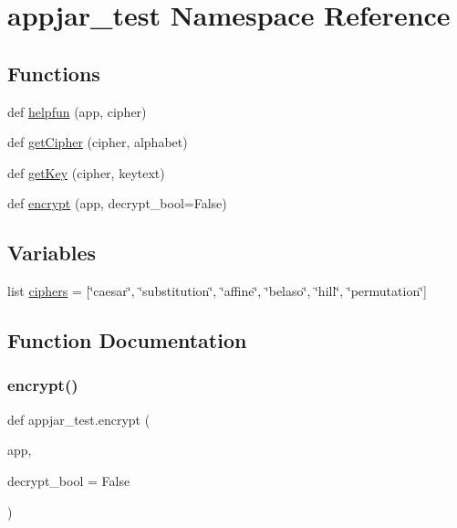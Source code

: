 \hypertarget{namespaceappjar__test}{}\section{appjar\+\_\+test Namespace Reference}
\label{namespaceappjar__test}
\subsection*{Functions}
\begin{DoxyCompactItemize}
\item 
def \mbox{\hyperlink{namespaceappjar__test_a35ead9b75f3a80c900d90925d6aacf58}{helpfun}} (app, cipher)
\item 
def \mbox{\hyperlink{namespaceappjar__test_a6abeaf134dae6285b648ef0e81159506}{get\+Cipher}} (cipher, alphabet)
\item 
def \mbox{\hyperlink{namespaceappjar__test_a13cd64e5fb029fcee4ed6e61fe859344}{get\+Key}} (cipher, keytext)
\item 
def \mbox{\hyperlink{namespaceappjar__test_a3b7395e7f8f122d03a183d0faa0fa494}{encrypt}} (app, decrypt\+\_\+bool=False)
\end{DoxyCompactItemize}
\subsection*{Variables}
\begin{DoxyCompactItemize}
\item 
list \mbox{\hyperlink{namespaceappjar__test_aeaee605feadc2cd9b1dfaa00166e8dc2}{ciphers}} = \mbox{[}\char`\"{}caesar\char`\"{}, \char`\"{}substitution\char`\"{}, \char`\"{}affine\char`\"{}, \char`\"{}belaso\char`\"{}, \char`\"{}hill\char`\"{}, \char`\"{}permutation\char`\"{}\mbox{]}
\end{DoxyCompactItemize}


\subsection{Function Documentation}
\mbox{\label{namespaceappjar__test_a3b7395e7f8f122d03a183d0faa0fa494}} 
\subsubsection{\texorpdfstring{encrypt()}{encrypt()}}
{\footnotesize\ttfamily def appjar\+\_\+test.\+encrypt (\begin{DoxyParamCaption}\item[{}]{app,  }\item[{}]{decrypt\+\_\+bool = {\ttfamily False} }\end{DoxyParamCaption})}

